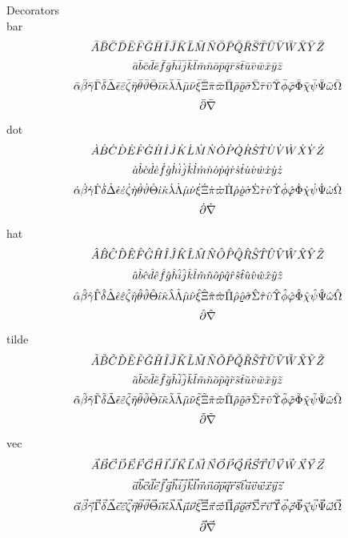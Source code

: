 \documentclass{article}
\begin{document}
Decorators\\

bar
\[ \Ab \Bb \Cb \Db \Eb \Fb \Gb \Hb \Ib \Jb \Kb \Lb \Mb \Nb \Ob \Pb \Qb \Rb \Sb \Tb \Ub \Vb \Wb \Xb \Yb \Zb \]
\[ \aab \bbb \ccb \ddb \eeb \ffb \ggb \hhb \iib \jjb \kkb \llb \mmb \nnb \oob \ppb \qqb \rrb \ssb \ttb \uub \vvb \wwb \xxb \yyb \zzb \]
\[ \alphab \betab \gammab \Gammab \deltab \Deltab \epsilonb \varepsilonb \zetab \etab \thetab \varthetab \Thetab \iotab \kappab \lambdab \Lambdab \mub \nub \xib \Xib \pib \varpib \Pib \rhob \varrhob \sigmab \Sigmab \taub \upsilonb \Upsilonb \phib \varphib \Phib \chib \psib \Psib \omegab \Omegab \]
\[ \partialb \nablab \]

dot
\[ \Ad \Bd \Cd \Dd \Ed \Fd \Gd \Hd \Idot \Jd \Kd \Ld \Md \Nd \Od \Pd \Qd \Rd \Sd \Td \Ud \Vd \Wd \Xd \Yd \Zd \]
\[ \aad \bbd \ccd \ddd \eed \ffd \ggd \hhd \iid \jjd \kkd \lld \mmd \nnd \ood \ppd \qqd \rrd \ssd \ttd \uud \vvd \wwd \xxd \yyd \zzd \]
\[ \alphad \betad \gammad \Gammad \deltad \Deltad \epsilond \varepsilond \zetad \etad \thetad \varthetad \Thetad \iotad \kappad \lambdad \Lambdad \mud \nud \xid \Xid \pid \varpid \Pid \rhod \varrhod \sigmad \Sigmad \taud \upsilond \Upsilond \phid \varphid \Phid \chid \psid \Psid \omegad \Omegad \]
\[ \partiald \nablad \]

hat
\[ \Ah \Bh \Ch \Dh \Eh \Fh \Gh \Hh \Ih \Jh \Kh \Lh \Mh \Nh \Oh \Ph \Qh \Rh \Sh \Th \Uh \Vh \Wh \Xh \Yh \Zh \]
\[ \aah \bbh \cch \ddh \eeh \ffh \ggh \hhh \iih \jjh \kkh \llh \mmh \nnh \ooh \pph \qqh \rrh \ssh \tth \uuh \vvh \wwh \xxh \yyh \zzh \]
\[ \alphah \betah \gammah \Gammah \deltah \Deltah \epsilonh \varepsilonh \zetah \etah \thetah \varthetah \Thetah \iotah \kappah \lambdah \Lambdah \muh \nuh \xih \Xih \pih \varpih \Pih \rhoh \varrhoh \sigmah \Sigmah \tauh \upsilonh \Upsilonh \phih \varphih \Phih \chih \psih \Psih \omegah \Omegah \]
\[ \partialh \nablah \]

tilde
\[ \At \Bt \Ct \Dt \Et \Ft \Gt \Ht \It \Jt \Kt \Lt \Mt \Nt \Ot \Pt \Qt \Rt \St \Tt \Ut \Vt \Wt \Xt \Yt \Zt \]
\[ \aat \bbt \cct \ddt \eet \fft \ggt \hht \iit \jjt \kkt \llt \mmt \nnt \oot \ppt \qqt \rrt \sst \ttt \uut \vvt \wwt \xxt \yyt \zzt \]
\[ \alphat \betat \gammat \Gammat \deltat \Deltat \epsilont \varepsilont \zetat \etat \thetat \varthetat \Thetat \iotat \kappat \lambdat \Lambdat \mut \nut \xit \Xit \pit \varpit \Pit \rhot \varrhot \sigmat \Sigmat \taut \upsilont \Upsilont \phit \varphit \Phit \chit \psit \Psit \omegat \Omegat \]
\[ \partialt \nablat \]

vec
\[ \Av \Bv \Cv \Dv \Ev \Fv \Gv \Hv \Iv \Jv \Kv \Lv \Mv \Nv \Ov \Pv \Qv \Rv \Sv \Tv \Uv \Vv \Wv \Xv \Yv \Zv \]
\[ \aav \bbv \ccv \ddv \eev \ffv \ggv \hhv \iiv \jjv \kkv \llv \mmv \nnv \oov \ppv \qqv \rrv \ssv \ttv \uuv \vvv \wwv \xxv \yyv \zzv \]
\[ \alphav \betav \gammav \Gammav \deltav \Deltav \epsilonv \varepsilonv \zetav \etav \thetav \varthetav \Thetav \iotav \kappav \lambdav \Lambdav \muv \nuv \xiv \Xiv \piv \varpiv \Piv \rhov \varrhov \sigmav \Sigmav \tauv \upsilonv \Upsilonv \phiv \varphiv \Phiv \chiv \psiv \Psiv \omegav \Omegav \]
\[ \partialv \nablav \]
\end{document}
